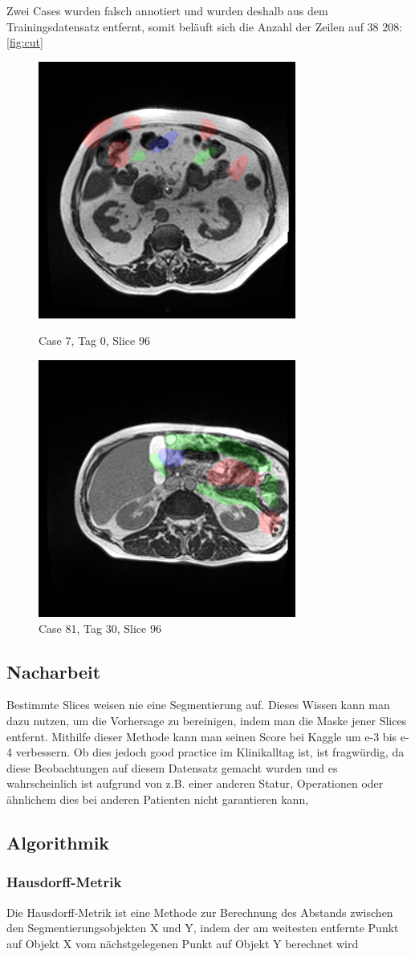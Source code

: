 Zwei Cases wurden falsch annotiert und wurden deshalb aus dem Trainingsdatensatz entfernt, somit beläuft sich die Anzahl der Zeilen auf 38 208: \autoref{fig:cut}

\begin{figure}[htp]
\centering
\includegraphics[width=.25\textwidth]{bilder/case7-day0-slice-0096}\hfill
\caption{Case 7, Tag 0, Slice 96}
\includegraphics[width=.25\textwidth]{bilder/case81-day30-slice-0096}\hfill
\caption{Case 81, Tag 30, Slice 96}
\label{fig:cut}
\end{figure}

\subsection{Nacharbeit}

Bestimmte Slices weisen nie eine Segmentierung auf. Dieses Wissen kann man dazu nutzen, um die Vorhersage zu bereinigen, indem man die Maske jener Slices entfernt. Mithilfe dieser Methode kann man seinen Score bei Kaggle um e-3 bis e-4 verbessern. Ob dies jedoch good practice im Klinikalltag ist, ist fragwürdig, da diese Beobachtungen auf diesem Datensatz gemacht wurden und es wahrscheinlich ist aufgrund von z.B. einer anderen Statur, Operationen oder ähnlichem dies bei anderen Patienten nicht garantieren kann,

\subsection{Algorithmik}

\subsubsection{Hausdorff-Metrik} \label{ssec:hdorff}
Die Hausdorff-Metrik ist eine Methode zur Berechnung des Abstands zwischen den Segmentierungsobjekten X und Y, indem der am weitesten entfernte Punkt auf Objekt X vom nächstgelegenen Punkt auf Objekt Y berechnet wird


